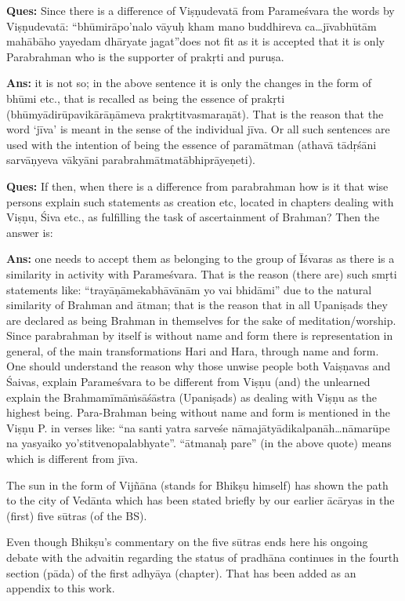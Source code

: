\textbf{Ques:} Since there is a difference of Viṣṇudevatā from Parameśvara the words by Viṣṇudevatā: “bhūmirāpo’nalo vāyuḥ kham mano buddhireva ca…jīvabhūtām mahābāho yayedam dhāryate jagat”does not fit as it is accepted that it is only Parabrahman who is the supporter of prakṛti and puruṣa.

\vskip 2pt

\textbf{Ans:} it is not so; in the above sentence it is only the changes in the form of bhūmi etc., that is recalled as being the essence of prakṛti (bhūmyādirūpavikārāṇāmeva prakṛtitvasmaraṇāt). That is the reason that the word ‘jīva’ is meant in the sense of the individual jīva. Or all such sentences are used with the intention of being the essence of paramātman (athavā tādṛśāni sarvāṇyeva vākyāni parabrahmātmatābhiprāyeṇeti).

\vskip 2pt

\textbf{Ques:} If then, when there is a difference from parabrahman how is it that  wise persons explain such statements as creation etc, located in chapters dealing with Viṣṇu, Śiva etc., as fulfilling the task of ascertainment of Brahman? Then the answer is:

\vskip 2pt

\textbf{Ans:} one needs to accept them as belonging to the group of Īśvaras as there is a similarity in activity with Parameśvara. That is the reason (there are) such smṛti statements like: “trayāṇāmekabhāvānām yo vai bhidāmi” due to the natural similarity of Brahman and ātman; that is the reason that in all Upaniṣads they are declared as being Brahman in themselves for the sake of meditation/worship. Since parabrahman by itself is without name and form there is representation in general, of the main transformations Hari and Hara, through name and form. One should understand the reason why those unwise people both  Vaiṣṇavas and Śaivas, explain Parameśvara to be different from Viṣṇu (and) the unlearned explain the Brahmamīmāṁsāśāstra (Upaniṣads) as dealing with Viṣṇu as the highest being. Para-Brahman being without name and form is mentioned in the Viṣṇu P. in verses like: “na santi yatra sarveśe nāmajātyādikalpanāh…nāmarūpe na yasyaiko yo’stitvenopalabhyate”. “ātmanaḥ pare” (in the above quote) means which is different from jīva.

\newpage

The sun in the form of Vijñāna (stands for Bhikṣu himself) has shown the path to the city of Vedānta which has been stated briefly by our earlier ācāryas in the (first) five sūtras (of the BS).

Even though Bhikṣu’s commentary on the five sūtras ends here his ongoing debate with the advaitin regarding the status of pradhāna continues in the fourth section (pāda) of the first adhyāya (chapter).  That has been added as an appendix to this work.
